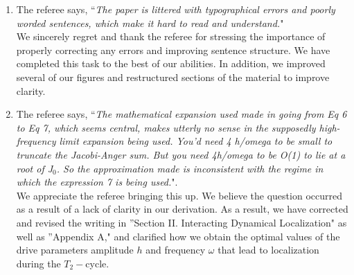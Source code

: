 \documentclass[aps,prb,reprint,showpacs,floatfix,superscriptaddress, onecolumn, 9pt]{revtex4-2}
\newcommand{\ar}[1]{{\color{blue}#1}} %
\begin{document}
\begin{enumerate}
    \item The referee says, ``\textit{The paper is littered with typographical errors and poorly worded sentences, which make it hard to read and understand.}"\\

    \ar{
We sincerely regret and thank the referee for stressing the importance of properly correcting any errors and improving sentence structure. We have completed this task to the best of our abilities. In addition, we improved several of our figures and restructured sections of the material to improve clarity.
    }
    \item The referee says, ``\textit{The mathematical
    expansion used made in going from Eq 6 to Eq 7, which seems central, makes utterly no sense in the supposedly high-frequency limit expansion being used. You'd need 4 h/omega to be small to truncate the Jacobi-Anger sum. But you need 4h/omega to be O(1) to lie at a root of J$_0$. So the approximation made is inconsistent with the regime in which the expression 7 is being used.}".\\

    \ar{
We appreciate the referee bringing this up. We believe the question occurred as a result of a lack of clarity in our derivation. As a result, we have corrected and revised the writing in ''Section II. Interacting Dynamical Localization" as well as ''Appendix A," and clarified how we obtain the optimal values of the drive parameters amplitude $h$ and frequency $\omega$ that lead to localization during the $T_2-$cycle. \\

}
\end{enumerate}
\end{document}
